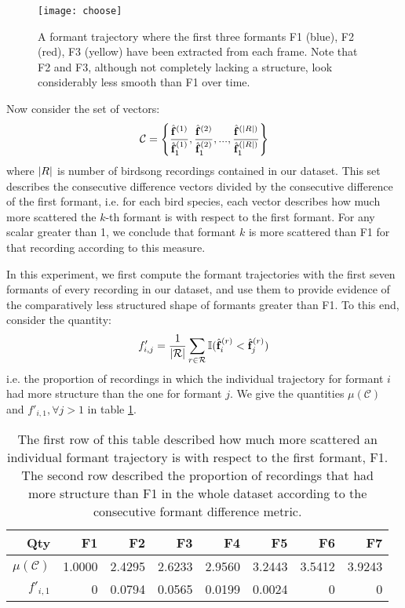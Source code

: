 \documentclass[../main.tex]{subfiles}
\begin{document}
\begin{figure}[ht]
\centering
\texttt{[image: choose]}
\caption{A formant trajectory where the first three formants F1 (blue), F2 (red), F3 (yellow) have been extracted from each frame. Note that F2 and F3, although not completely lacking a structure, look considerably less smooth than F1 over time.}
\label{fig_choose}
\end{figure}
\par Now consider the set of vectors:
\begin{align*}
\mathcal{C} = \left\{\frac{\hat{\mathbf{f}}^{(1)}}{\hat{\mathbf{f}}^{(1)}_1}, \frac{\hat{\mathbf{f}}^{(2)}}{\hat{\mathbf{f}}^{(2)}_1}, ..., \frac{\hat{\mathbf{f}}^{(\lvert R\rvert)}}{\hat{\mathbf{f}}^{(\lvert R\rvert)}_1}\right\}
\end{align*}
where $\lvert R\rvert$ is number of birdsong recordings contained in our dataset. This set describes the consecutive difference vectors divided by the consecutive difference of the first formant, i.e. for each bird species, each vector describes how much more scattered the $k$-th formant is with respect to the first formant. For any scalar greater than 1, we conclude that formant $k$ is more scattered than F1 for that recording according to this measure. 
\par In this experiment, we first compute the formant trajectories with the first seven formants of every recording in our dataset, and use them to provide evidence of the comparatively less structured shape of formants greater than F1. To this end, consider the quantity:
\begin{align*}
f'_{i, j} = \frac{1}{\lvert\mathcal{R}\rvert}\sum_{r \in \mathcal{R}} \mathbb{I}(\hat{\mathbf{f}}^{(r)}_i < \hat{\mathbf{f}}^{(r)}_j)
\end{align*}
i.e. the proportion of recordings in which the individual trajectory for formant $i$ had more structure than the one for formant $j$. We give the quantities $\mu(\mathcal{C})$ and $f'_{i, 1}, \forall j > 1$ in table  \ref{table_choose}.
\begin{table}[ht]
\centering
\begin{tabular}{r|r|r|r|r|r|r|r} 
 \textbf{Qty} &\textbf{F1} &  \textbf{F2}&  \textbf{F3}&  \textbf{F4}&  \textbf{F5}&  \textbf{F6}&  \textbf{F7}\\
 \hline
 $\mu(\mathcal{C})$ & 1.0000  &  2.4295  &  2.6233  &  2.9560  &  3.2443  &  3.5412  &  3.9243 \\
 $f'_{i, 1}$ & 0 & 0.0794 & 0.0565 & 0.0199 & 0.0024 & 0 & 0
\end{tabular}
\caption{The first row of this table described how much more scattered an individual formant trajectory is with respect to the first formant, F1. The second row described the proportion of recordings that had more structure than F1 in the whole dataset according to the consecutive formant difference metric.}\label{table_choose}
\end{table}
\end{document}

